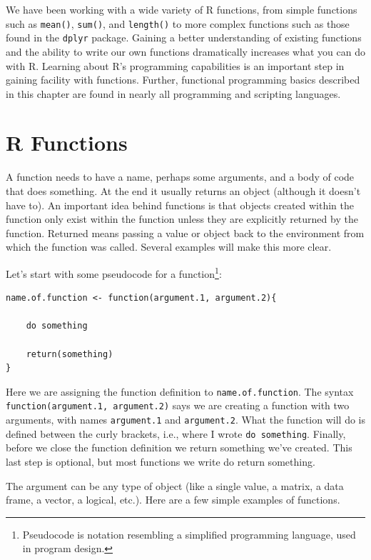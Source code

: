 \documentclass[]{krantz}
\begin{document}
We have been working with a wide variety of R functions, from simple functions such as \texttt{mean()}, \texttt{sum()}, and \texttt{length()} to more complex functions such as those found in the \texttt{dplyr} package. Gaining a better understanding of existing functions and the ability to write our own functions dramatically increases what you can do with R. Learning about R's programming capabilities is an important step in gaining facility with functions. Further, functional programming basics described in this chapter are found in nearly all programming and scripting languages.

\hypertarget{r-functions}{%
\section{R Functions}\label{r-functions}}

A function needs to have a name, perhaps some arguments, and a body of code that does something. At the end it usually returns an object (although it doesn't have to). An important idea behind functions is that objects created within the function only exist within the function unless they are explicitly returned by the function. Returned means passing a value or object back to the environment from which the function was called. Several examples will make this more clear.

Let's start with some pseudocode for a function\footnote{Pseudocode is notation resembling a simplified programming language, used in program design.}:

\begin{verbatim}
name.of.function <- function(argument.1, argument.2){
  
    do something
    
    return(something)
}
\end{verbatim}

Here we are assigning the function definition to \texttt{name.of.function}. The syntax \texttt{function(argument.1,\ argument.2)} says we are creating a function with two arguments, with names \texttt{argument.1} and \texttt{argument.2}. What the function will do is defined between the curly brackets, i.e., where I wrote \texttt{do\ something}. Finally, before we close the function definition we return something we've created. This last step is optional, but most functions we write do return something.

The argument can be any type of object (like a single value, a matrix, a data frame, a vector, a logical, etc.). Here are a few simple examples of functions.
\end{document}
